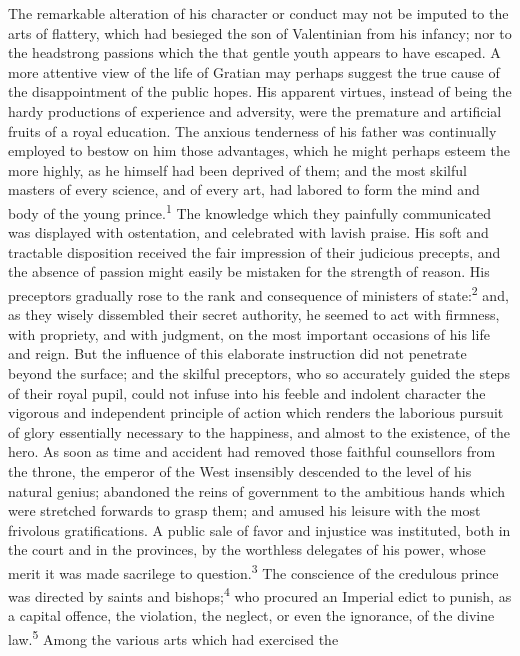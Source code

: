 The remarkable alteration of his character or conduct may not be
imputed to the arts of flattery, which had besieged the son of
Valentinian from his infancy; nor to the headstrong passions
which the that gentle youth appears to have escaped. A more
attentive view of the life of Gratian may perhaps suggest the
true cause of the disappointment of the public hopes. His
apparent virtues, instead of being the hardy productions of
experience and adversity, were the premature and artificial
fruits of a royal education. The anxious tenderness of his father
was continually employed to bestow on him those advantages, which
he might perhaps esteem the more highly, as he himself had been
deprived of them; and the most skilful masters of every science,
and of every art, had labored to form the mind and body of the
young prince.\textsuperscript{1} The knowledge which they painfully communicated
was displayed with ostentation, and celebrated with lavish
praise. His soft and tractable disposition received the fair
impression of their judicious precepts, and the absence of
passion might easily be mistaken for the strength of reason. His
preceptors gradually rose to the rank and consequence of
ministers of state:\textsuperscript{2} and, as they wisely dissembled their secret
authority, he seemed to act with firmness, with propriety, and
with judgment, on the most important occasions of his life and
reign. But the influence of this elaborate instruction did not
penetrate beyond the surface; and the skilful preceptors, who so
accurately guided the steps of their royal pupil, could not
infuse into his feeble and indolent character the vigorous and
independent principle of action which renders the laborious
pursuit of glory essentially necessary to the happiness, and
almost to the existence, of the hero. As soon as time and
accident had removed those faithful counsellors from the throne,
the emperor of the West insensibly descended to the level of his
natural genius; abandoned the reins of government to the
ambitious hands which were stretched forwards to grasp them; and
amused his leisure with the most frivolous gratifications. A
public sale of favor and injustice was instituted, both in the
court and in the provinces, by the worthless delegates of his
power, whose merit it was made sacrilege to question.\textsuperscript{3} The
conscience of the credulous prince was directed by saints and
bishops;\textsuperscript{4} who procured an Imperial edict to punish, as a capital
offence, the violation, the neglect, or even the ignorance, of
the divine law.\textsuperscript{5} Among the various arts which had exercised the
